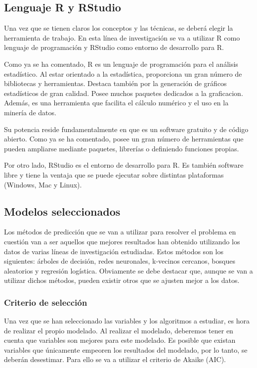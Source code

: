 \subsection{Lenguaje R y RStudio}
Una vez que se tienen claros los conceptos y las técnicas, se deberá elegir la herramienta de trabajo. En esta línea de investigación se va a utilizar R como lenguaje de programación y RStudio como entorno de desarrollo para R.

Como ya se ha comentado, R es un lenguaje de programación para el análisis estadístico. Al estar orientado a la estadística, proporciona un gran número de bibliotecas y herramientas. Destaca también por la generación de gráficos estadísticos de gran calidad. Posee muchos paquetes dedicados a la graficacion. Además, es una herramienta que facilita el cálculo numérico y el uso en la minería de datos. \cite{emanuel2014}

Su potencia reside fundamentalmente en que es un software gratuito y de código abierto. Como ya se ha comentado, posee un gran número de herramientas que pueden ampliarse mediante paquetes, librerías o definiendo funciones propias.

Por otro lado, RStudio es el entorno de desarrollo para R. Es también software libre y tiene la ventaja que se puede ejecutar sobre distintas plataformas (Windows, Mac y Linux).

\subsection{Modelos seleccionados}
Los métodos de predicción que se van a utilizar para resolver el problema en cuestión van a ser aquellos que mejores resultados han obtenido utilizando los datos de varias líneas de investigación estudiadas. Estos métodos son los siguientes: árboles de decisión, redes neuronales, k-vecinos cercanos, bosques aleatorios y regresión logística. Obviamente se debe destacar que, aunque se van a utilizar dichos métodos, pueden existir otros que se ajusten mejor a los datos.

\subsubsection{Criterio de selección}
Una vez que se han seleccionado las variables y los algoritmos a estudiar, es hora de realizar el propio modelado. Al realizar el modelado, deberemos tener en cuenta que variables son mejores para este modelado. Es posible que existan variables que únicamente empeoren los resultados del modelado, por lo tanto, se deberán desestimar. Para ello se va a utilizar el criterio de Akaike (AIC). 

